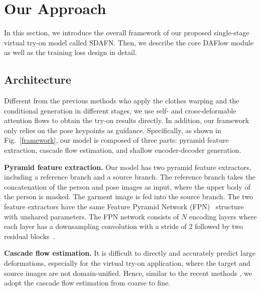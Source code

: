 \documentclass[runningheads]{llncs}
\begin{document}
\section{Our Approach}

In this section, we introduce the overall framework of our proposed single-stage virtual try-on model called SDAFN. Then, we describe the core DAFlow module as well as the training loss design in detail. 

\begin{figure}[t]
\end{figure}

\subsection{Architecture\label{sec:arc}}
Different from the previous methods who apply the clothes warping and the conditional generation in different stages, we use self- and cross-deformable attention flows to obtain the try-on results directly. In addition, our framework only relies on the pose keypoints as guidance. Specifically, as shown in Fig.~\ref{framework}, our model is composed of three parts: pyramid feature extraction, cascade flow estimation, and shallow encoder-decoder generation.

\textbf{Pyramid feature extraction.} 
Our model has two pyramid feature extractors, including a reference branch and a source branch. The reference branch takes the concatenation of the person and pose images as input, where the upper body of the person is masked. The garment image is fed into the source branch. The two feature extractors have the same Feature Pyramid Network (FPN)~\cite{fpn} structure with unshared parameters. The FPN network consists of $N$ encoding layers where each layer has a downsampling convolution with a stride of 2 followed by two residual blocks~\cite{resnet}. 

\textbf{Cascade flow estimation.} It is difficult to directly and accurately predict large deformations, especially for the virtual try-on application, where the target and source images are not domain-unified. Hence, similar to the recent methods \cite{han2019clothflow,ge2021parser}, we adopt the cascade flow estimation from coarse to fine.
\end{document}
